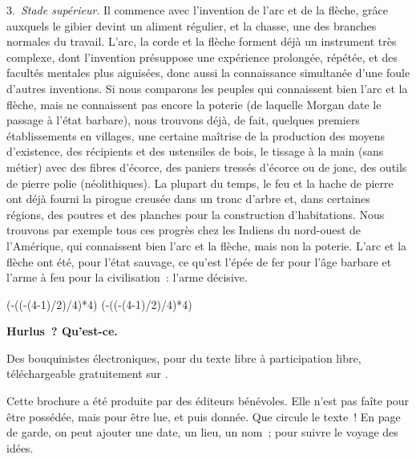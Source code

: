 \documentclass[french,twoside]{book} %
\def\truncdiv#1#2{((#1-(#2-1)/2)/#2)}
\def\moduloop#1#2{(#1-\truncdiv{#1}{#2}*#2)}
\def\modulo#1#2{\number\numexpr\moduloop{#1}{#2}\relax}
\begin{document}
3. \emph{Stade supérieur}. Il commence avec l’invention de l’arc et de la flèche, grâce auxquels le gibier devint un aliment régulier, et la chasse, une des branches normales du travail. L’arc, la corde et la flèche forment déjà un instrument très complexe, dont l’invention présuppose une expérience prolongée, répétée, et des facultés mentales plus aiguisées, donc aussi la connaissance simultanée d’une foule d’autres inventions. Si nous comparons les peuples qui connaissent bien l’arc et la flèche, mais ne connaissent pas encore la poterie (de laquelle Morgan date le passage à l’état barbare), nous trouvons déjà, de fait, quelques premiers établissements en villages, une certaine maîtrise de la production des moyens d’existence, des récipients et des ustensiles de bois, le tissage à la main (sans métier) avec des fibres d’écorce, des paniers tressés d’écorce ou de jonc, des outils de pierre polie (néolithiques). La plupart du temps, le feu et la hache de pierre ont déjà fourni la pirogue creusée dans un tronc d’arbre et, dans certaines régions, des poutres et des planches pour la construction d’habitations. Nous trouvons par exemple tous ces progrès chez les Indiens du nord-ouest de l’Amérique, qui connaissent bien l’arc et la flèche, mais non la poterie. L’arc et la flèche ont été, pour l’état sauvage, ce qu’est l’épée de fer pour l’âge barbare et l’arme à feu pour la civilisation : l’arme décisive.
 


\ifbooklet
  \pagestyle{empty}
  \clearpage
  \ifnum\modulo{\value{page}}{4}=0 \hbox{}\newpage\hbox{}\newpage\fi
  \ifnum\modulo{\value{page}}{4}=1 \hbox{}\newpage\hbox{}\newpage\fi


  \hbox{}\newpage
  \ifodd\value{page}\hbox{}\newpage\fi
  {\centering\color{rubric}\bfseries\noindent\large
    Hurlus ? Qu’est-ce.\par
    \bigskip
  }
  \noindent Des bouquinistes électroniques, pour du texte libre à participation libre,
  téléchargeable gratuitement sur \href{https://hurlus.fr}{}.\par
  \bigskip
  \noindent Cette brochure a été produite par des éditeurs bénévoles.
  Elle n’est pas faîte pour être possédée, mais pour être lue, et puis donnée.
  Que circule le texte !
  En page de garde, on peut ajouter une date, un lieu, un nom ; pour suivre le voyage des idées.
  \par
\end{document}

